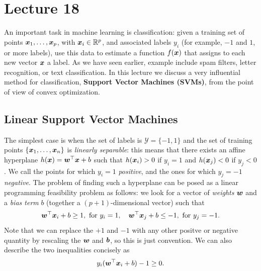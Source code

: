 %
%
% 


\chapter*{Lecture 18}
\addtocounter{chapter}{18}
\addtocounter{section}{0}

An important task in machine learning is classification: given a training set of points $\bm{x}_1,\dots,\bm{x}_p$, with $\bm{x}_i\in \mathbb{R}^p$, and associated labels $y_i$ (for example, $-1$ and $1$, or more labels), use this data to estimate a function $f(\bm{x})$ that assigns to each new vector $\bm{x}$ a label. As we have seen earlier, example include spam filters, letter recognition, or text classification. In this lecture we discuss a very influential method for classification, \textbf{Support Vector Machines (SVMs)}, from the point of view of convex optimization.

\section{Linear Support Vector Machines}
The simplest case is when the set of labels is $\mathcal{Y}=\{-1,1\}$ and the set of training points $\{\bm{x}_1,\dots,\bm{x}_n\}$ is {\em linearly separable}: this means that there exists an affine hyperplane $h(\bm{x})=\bm{w}^{\top}\bm{x}+b$ such that $h(\bm{x}_i)>0$ if $y_i=1$ and $h(\bm{x}_j)<0$ if $y_j<0$. We call the points for which $y_i=1$ {\em positive}, and the ones for which $y_j=-1$ {\em negative}.
The problem of finding such a hyperplane can be posed as a linear programming feasibility problem as follows: we look for a vector of {\em weights} $\bm{w}$ and a {\em bias term} $b$ (together a $(p+1)$-dimensional vector) such that 
\begin{equation*}
  \bm{w}^{\top}\bm{x}_i+b\geq 1, \text{ for } y_i=1, \quad \bm{w}^{\top}\bm{x}_j+b\leq -1, \text{ for } y_j=-1.
\end{equation*}
Note that we can replace the $+1$ and $-1$ with any other positve or negative quantity by rescaling the $\bm{w}$ and $\bm{b}$, so this is just convention. We can also describe the two inequalities concisely as
\begin{equation}\label{eq:sephyp}
  y_i(\bm{w}^{\top}\bm{x}_i+b)-1 \geq 0.
\end{equation}

